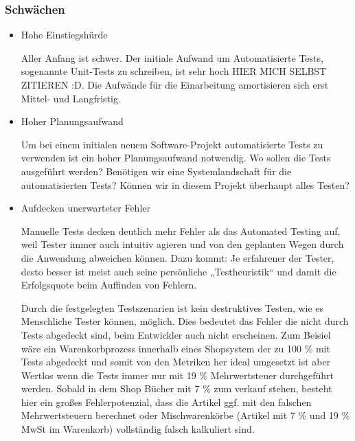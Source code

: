 \subsubsection{Schwächen}
\begin{itemize}	
	\item Hohe Einstiegshürde
	
	Aller Anfang ist schwer. Der initiale Aufwand um Automatisierte Tests, sogenannte Unit-Tests zu schreiben, ist sehr hoch HIER MICH SELBST ZITIEREN :D. Die Aufwände für die Einarbeitung amortisieren sich erst Mittel- und Langfristig.
	
	\item Hoher Planungsaufwand
	
	Um bei einem initialen neuem Software-Projekt automatisierte Tests zu verwenden ist ein hoher Planungsaufwand notwendig. Wo sollen die Tests ausgeführt werden? Benötigen wir eine Systemlandschaft für die automatisierten Tests? Können wir in diesem Projekt überhaupt alles Testen?
	
	\item Aufdecken unerwarteter Fehler
	
	Manuelle Tests decken deutlich mehr Fehler als das Automated Testing auf, weil Tester immer auch intuitiv agieren und von den geplanten Wegen durch die Anwendung abweichen können. Dazu kommt: Je erfahrener der Tester, desto besser ist meist auch seine persönliche „Testheuristik“ und damit die Erfolgsquote beim Auffinden von Fehlern.
	
	Durch die festgelegten Testszenarien ist kein destruktives Testen, wie es Menschliche Tester können, möglich. Dies bedeutet das Fehler die nicht durch Tests abgedeckt sind, beim Entwickler auch nicht erscheinen. Zum Beisiel wäre ein Warenkorbprozess innerhalb eines Shopsystem der zu 100 \% mit Tests abgedeckt und somit von den Metriken her ideal umgesetzt ist aber Wertlos wenn die Tests immer nur mit 19 \% Mehrwertsteuer durchgeführt werden. Sobald in dem Shop Bücher mit 7 \% zum verkauf stehen, besteht hier ein großes Fehlerpotenzial, dass die Artikel ggf. mit den falschen Mehrwertsteuern berechnet oder Mischwarenkörbe (Artikel mit 7 \% und 19 \% MwSt im Warenkorb) vollständig falsch kalkuliert sind. 
	
\end{itemize}
